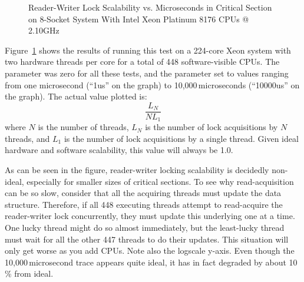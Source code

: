 \begin{figure}[tb]
\centering
{}
\caption{Reader-Writer Lock Scalability vs. Microseconds in Critical Section on 8-Socket System With Intel Xeon Platinum 8176 CPUs @ 2.10GHz}
\label{fig:toolsoftrade:Reader-Writer Lock Scalability vs. Microseconds in Critical Section}
\end{figure}

Figure~\ref{fig:toolsoftrade:Reader-Writer Lock Scalability vs. Microseconds in Critical Section}
shows the results of running this test on a 224-core Xeon system
with two hardware threads per core for a total of 448 software-visible
CPUs.
The  parameter was zero for all these tests, and the
 parameter set to values ranging from one microsecond (``1us''
on the graph) to 10,000\,microseconds (``10000us'' on the graph).
The actual value plotted is:
\begin{equation}
	\frac{L_N}{N L_1}
\end{equation}
where $N$ is the number of threads,
$L_N$ is the number of lock acquisitions by $N$ threads, and
$L_1$ is the number of lock acquisitions by a single thread.
Given ideal hardware and software scalability, this value will always
be 1.0.

As can be seen in the figure, reader-writer locking scalability is
decidedly non-ideal, especially for smaller sizes of critical
sections.
To see why read-acquisition can be so slow, consider
that all the acquiring threads must update the 
data structure.
Therefore, if all 448 executing threads attempt to
read-acquire the reader-writer lock concurrently, they must update
this underlying  one at a time.
One lucky thread might do so almost immediately, but the least-lucky
thread must wait for all the other 447 threads to do their updates.
This situation will only get worse as you add CPUs.
Note also the logscale y-axis.
Even though the 10,000\,microsecond trace appears quite ideal, it has
in fact degraded by about 10\,\% from ideal.

